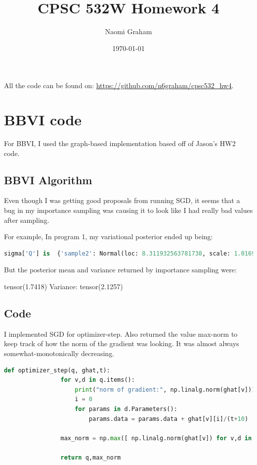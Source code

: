 \documentclass[12pt]{article}%
\theoremstyle{definition}
\begin{document}
	
	\title{CPSC 532W Homework 4}
	\author{Naomi Graham}
	\date{\today}
	\maketitle
	
	All the code can be found on: \url{https://github.com/n6graham/cpsc532_hw4}.
	
		\section{BBVI code}
		
		
		For BBVI, I used the graph-based implementation based off of Jason's HW2 code.
		
		
		\subsection{BBVI Algorithm}
		
		Even though I was getting good proposals from running SGD, it seems that a bug in my importance sampling was causing it to look like I had really bad values after sampling.
		
		For example, In program 1, my variational posterior ended up being:
			\begin{lstlisting}[language=Python]
			sigma['Q'] is  {'sample2': Normal(loc: 8.311932563781738, scale: 1.0169004201889038)}
			\end{lstlisting}
		
		But the posterior mean and variance returned by importance sampling were:
		
		tensor(1.7418) Variance:  tensor(2.1257)
		
		\subsection{Code}
		
		I implemented SGD for optimizer-step. Also returned the value max-norm to keep track of how the norm of the gradient was looking. It was almost always somewhat-monotonically decreasing.
		
		\begin{lstlisting}[language=Python]
		def optimizer_step(q, ghat,t):
		        for v,d in q.items():
		            print("norm of gradient:", np.linalg.norm(ghat[v]))
		            i = 0
		            for params in d.Parameters():
		                params.data = params.data + ghat[v][i]/(t+10) 
		
		        max_norm = np.max([ np.linalg.norm(ghat[v]) for v,d in q.items()])
		
		        return q,max_norm
		\end{lstlisting}
		
\end{document}
